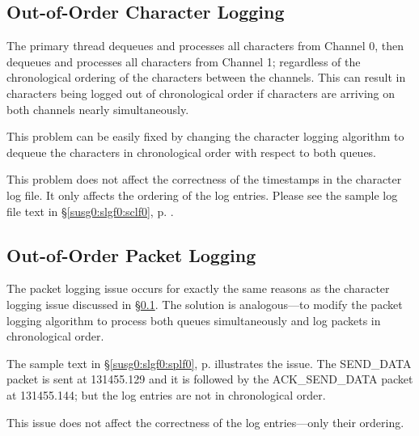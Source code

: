 \documentclass[letterpaper,10pt,titlepage]{article}
\begin{document}
\subsection{Out-of-Order Character Logging}
\label{skli0:sooc0}

The primary thread dequeues and processes all characters from 
Channel 0, then dequeues and processes all characters from Channel 1;
regardless of the chronological ordering of the characters between the
channels.
This can result in characters being logged out of chronological order if
characters are arriving on both channels nearly simultaneously.

This problem can be easily fixed by changing the character logging
algorithm to dequeue the characters in chronological order with respect
to
both queues.

This problem does not affect the correctness of the timestamps in the 
character log file.  It only affects the ordering of the log
entries.  Please see the sample log file text in
\S{}\ref{susg0:slgf0:sclf0}, p. \pageref{susg0:slgf0:sclf0}.


\subsection{Out-of-Order Packet Logging}
\label{skli0:soop0}

The packet logging issue occurs for exactly the same reasons as the
character logging issue discussed in 
\S{}\ref{skli0:sooc0}.  The solution is analogous---to modify the
packet logging algorithm to process both queues simultaneously and
log packets in chronological order.

The sample text in \S{}\ref{susg0:slgf0:splf0}, p. \pageref{susg0:slgf0:splf0}
illustrates the issue.  The SEND\_DATA packet is sent at 131455.129 and it is
followed by the ACK\_SEND\_DATA packet at 131455.144; but the log entries are 
not in chronological order.

This issue does not affect the correctness of the log entries---only their 
ordering.


\end{document}
